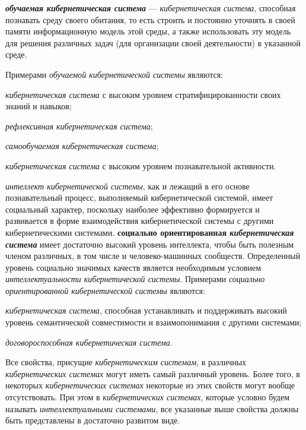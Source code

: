 \textbf{\textit{обучаемая кибернетическая система}} --- \textit{кибернетическая система}, способная познавать среду своего обитания, то есть строить и постоянно уточнять в своей памяти информационную модель этой среды, а также использовать эту модель для решения различных задач (для организации своей деятельности) в указанной среде. 

Примерами \textit{обучаемой кибернетической системы} являются:
\begin{textitemize}
    \item \textit{кибернетическая система} с высоким уровнем стратифицированности своих знаний и навыков;
    \item \textit{рефлексивная кибернетическая система};
    \item \textit{самообучаемая кибернетическая система};
    \item \textit{кибернетическая система} с высоким уровнем познавательной активности.
\end{textitemize}

\textit{интеллект кибернетической системы}, как и лежащий в его основе познавательный процесс, выполняемый кибернетической системой, имеет социальный характер, поскольку наиболее эффективно формируется и развивается в форме взаимодействия кибернетической системы с другими кибернетическими системами.
\textbf{социально ориентированная \textit{кибернетическая система}} имеет достаточно высокий уровень интеллекта, чтобы быть полезным членом различных, в том числе и человеко-машинных сообществ. Определенный уровень социально значимых качеств является необходимым условием \textit{интеллектуальности кибернетической системы}.
Примерами \textit{социально ориентированной кибернетической системы} являются:
\begin{textitemize}
    \item \textit{кибернетическая система}, способная устанавливать и поддерживать высокий уровень семантической совместимости и взаимопонимания с другими системами;
    \item \textit{договороспособная кибернетическая система}.
\end{textitemize}

Все свойства, присущие \textit{кибернетическим системам}, в различных \textit{кибернетических системах} могут иметь самый различный уровень. Более того, в некоторых \textit{кибернетических системах} некоторые из этих свойств могут вообще отсутствовать.
При этом в \textit{кибернетических системах}, которые условно будем называть \textit{интеллектуальными системами}, все указанные выше свойства должны быть представлены в достаточно развитом виде.
